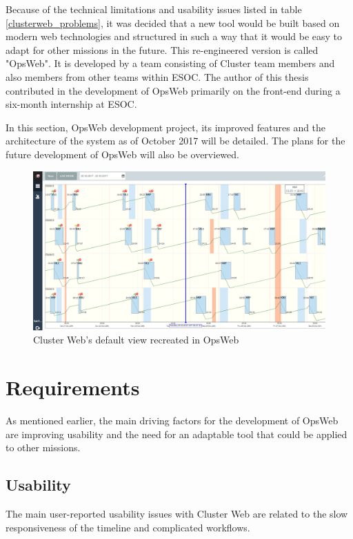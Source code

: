 Because of the technical limitations and usability issues listed in table \ref{clusterweb_problems}, it was decided that a new tool would be built based on modern web technologies and structured in such a way that it would be easy to adapt for other missions in the future. This re-engineered version is called "OpsWeb". It is developed by a team consisting of Cluster team members and also members from other teams within ESOC. The author of this thesis contributed in the development of OpsWeb primarily on the front-end during a six-month internship at ESOC.

In this section, OpsWeb development project, its improved features and the architecture of the system as of October 2017 will be detailed. The plans for the future development of OpsWeb will also be overviewed.

\begin{figure}[ht]
  \begin{center}
    \includegraphics*[width=1\textwidth]{new_cw}
  \end{center}
  \caption{Cluster Web's default view recreated in OpsWeb}
  \label{fig:new_cw}
\end{figure}

\section{Requirements}
As mentioned earlier, the main driving factors for the development of OpsWeb are improving usability and the need for an adaptable tool that could be applied to other missions.
\subsection{Usability} \label{usability_req}
The main user-reported usability issues with Cluster Web are related to the slow responsiveness of the timeline and complicated workflows. 


